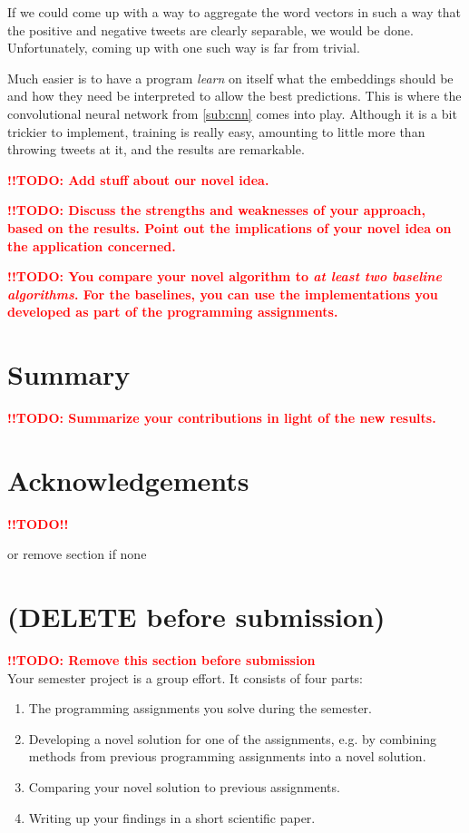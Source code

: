 \documentclass[10pt,conference,compsocconf]{IEEEtran}
\newcommand{\todo}{\textcolor{red}{\textbf{!!TODO!!}}}
\newcommand{\todoThis}[1]{\textcolor{red}{\textbf{!!TODO: #1}}}
\begin{document}
If we could come up with a way to aggregate the word vectors in such a way that the positive and negative tweets are clearly separable, we would be done. Unfortunately, coming up with one such way is far from trivial.

Much easier is to have a program \textit{learn} on itself what the embeddings should be and how they need be interpreted to allow the best predictions. This is where the convolutional neural network from \autoref{sub:cnn} comes into play. Although it is a bit trickier to implement, training is really easy, amounting to little more than throwing tweets at it, and the results are remarkable.

\todoThis{Add stuff about our novel idea.}

\todoThis{Discuss the strengths and weaknesses of your
  approach, based on the results. Point out the implications of your
  novel idea on the application concerned.}
  
\todoThis{You compare your novel algorithm to \emph{at least two baseline
  algorithms}. For the baselines, you can use the implementations you
developed as part of the programming assignments.\\}
  
\section{Summary}\label{sec:summary}
\todoThis{Summarize your contributions in light of the new
  results.}

\section*{Acknowledgements}
\todo

or remove section if none



\section{(DELETE before submission)}
\todoThis{Remove this section before submission}\\

Your semester project is a group effort. It consists of four parts:
\begin{enumerate}
\item The programming assignments you solve during the semester.
\item Developing a novel solution for one of the assignments, e.g. by
  combining methods from previous programming assignments into a novel
  solution.
\item Comparing your novel solution to previous assignments.
\item Writing up your findings in a short scientific paper.
\end{enumerate}
\end{document}
